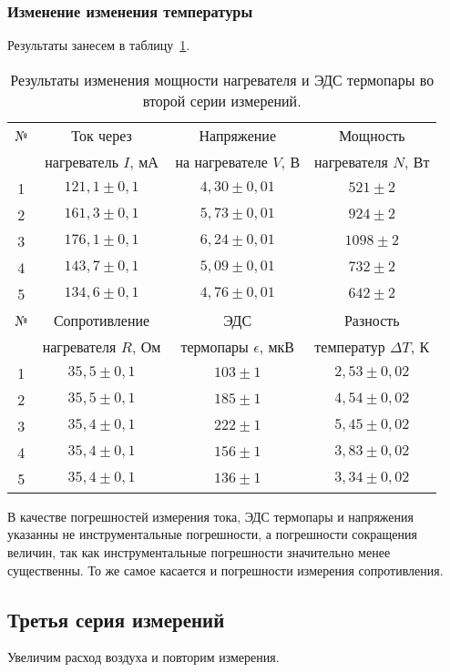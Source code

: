 \documentclass[a4paper,11pt]{article}
\begin{document}
\subsubsection{Изменение изменения температуры}
Результаты занесем в таблицу~\ref{table:tab4}.
\begin{table}[h!]
\centering
\begin{tabular}{ ||c|c|c|c|| }
  \hline
  № & Ток через & Напряжение & Мощность \\
   & нагреватель $I$, $мА$ & на нагревателе $V$, $В$ & нагревателя $N$, $Вт$ \\
  \hline
  1 & $121,1 \pm 0,1$ & $4,30 \pm 0,01$ & $521 \pm 2$ \\
  2 & $161,3 \pm 0,1$ & $5,73 \pm 0,01$ & $924 \pm 2$ \\
  3 & $176,1 \pm 0,1$ & $6,24 \pm 0,01$ & $1098 \pm 2$ \\
  4 & $143,7 \pm 0,1$ & $5,09 \pm 0,01$ & $732 \pm 2$ \\
  5 & $134,6 \pm 0,1$ & $4,76 \pm 0,01$ & $642 \pm 2$ \\
  \hline\hline
  № & Сопротивление & ЭДС & Разность \\
   & нагревателя $R$, $Ом$ & термопары $\epsilon$, $мкВ$ & температур $\Delta T$, $К$ \\
  \hline
  1 & $35,5 \pm 0,1$ & $103 \pm 1$ & $2,53 \pm 0,02$ \\
  2 & $35,5 \pm 0,1$ & $185 \pm 1$ & $4,54 \pm 0,02$ \\
  3 & $35,4 \pm 0,1$ & $222 \pm 1$ & $5,45 \pm 0,02$ \\
  4 & $35,4 \pm 0,1$ & $156 \pm 1$ & $3,83 \pm 0,02$ \\
  5 & $35,4 \pm 0,1$ & $136 \pm 1$ & $3,34 \pm 0,02$ \\
  \hline
\end{tabular}
\caption{Результаты изменения мощности нагревателя и ЭДС термопары во второй серии измерений.}
\label{table:tab4}
\end{table}
\newline
В качестве погрешностей измерения тока, ЭДС термопары и напряжения указанны не инструментальные погрешности, а погрешности сокращения величин, так как инструментальные погрешности значительно менее существенны. То же самое касается и погрешности измерения сопротивления.
\subsection{Третья серия измерений}
Увеличим расход воздуха и повторим измерения.
\end{document}
